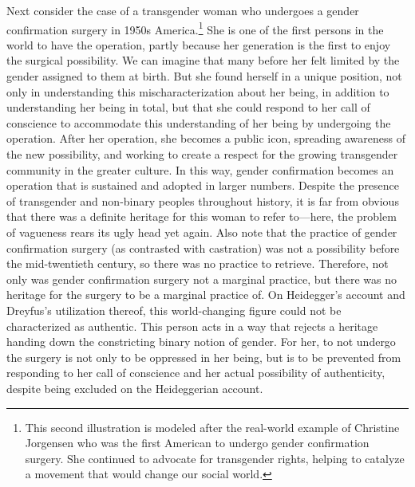 Next consider the case of a transgender woman who undergoes a gender
confirmation surgery in 1950s America.\footnote{This second illustration
  is modeled after the real-world example of Christine Jorgensen who was
  the first American to undergo gender confirmation surgery. She
  continued to advocate for transgender rights, helping to catalyze a
  movement that would change our social world.} She is one of the first
persons in the world to have the operation, partly because her
generation is the first to enjoy the surgical possibility. We can
imagine that many before her felt limited by the gender assigned to them
at birth. But she found herself in a unique position, not only in
understanding this mischaracterization about her being, in addition to
understanding her being in total, but that she could respond to her call
of conscience to accommodate this understanding of her being by
undergoing the operation. After her operation, she becomes a public
icon, spreading awareness of the new possibility, and working to create
a respect for the growing transgender community in the greater culture.
In this way, gender confirmation becomes an operation that is sustained
and adopted in larger numbers. Despite the presence of transgender and
non-binary peoples throughout history, it is far from obvious that there
was a definite heritage for this woman to refer to---here, the problem
of vagueness rears its ugly head yet again. Also note that the practice
of gender confirmation surgery (as contrasted with castration) was not a
possibility before the mid-twentieth century, so there was no practice
to retrieve. Therefore, not only was gender confirmation surgery not a
marginal practice, but there was no heritage for the surgery to be a
marginal practice of. On Heidegger's account and Dreyfus's utilization
thereof, this world-changing figure could not be characterized as
authentic. This person acts in a way that rejects a heritage handing
down the constricting binary notion of gender. For her, to not undergo
the surgery is not only to be oppressed in her being, but is to be
prevented from responding to her call of conscience and her actual
possibility of authenticity, despite being excluded on the Heideggerian
account.

